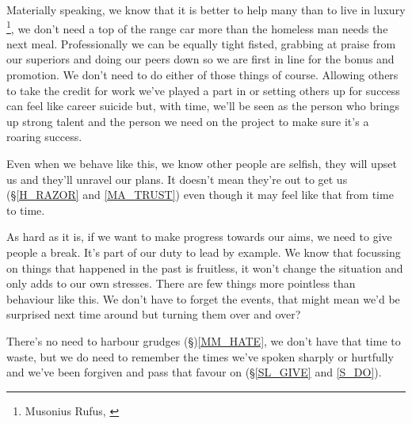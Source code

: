 \cleardoublepage
\begin{multicols}{2}

Materially speaking, we know that it is better to help many than to live in luxury \footnote{Musonius Rufus, \cite{RLS}}, we don't need a top of the range car more than the homeless man needs the next meal. Professionally we can be equally tight fisted, grabbing at praise from our superiors and doing our peers down so we are first in line for the bonus and promotion. We don't need to do either of those things of course. Allowing others to take the credit for work we've played a part in or setting others up for success can feel like career suicide but, with time, we'll be seen as the person who brings up strong talent and the person we need on the project to make sure it's a roaring success.

Even when we behave like this, we know other people are selfish, they will upset us and they'll unravel our plans. It doesn't mean they're out to get us (\S \ref{H_RAZOR} and \ref{MA_TRUST}) even though it may feel like that from time to time.

As hard as it is, if we want to make progress towards our aims, we need to give people a break. It's part of our duty to lead by example. We know that focussing on things that happened in the past is fruitless, it won't change the situation and only adds to our own stresses. There are few things more pointless than behaviour like this. We don't have to forget the events, that might mean we'd be surprised next time around but turning them over and over?

There's no need to harbour grudges (\S)\ref{MM_HATE}, we don't have that time to waste, but we do need to remember the times we've spoken sharply or hurtfully and we've been forgiven and pass that favour on (\S \ref{SL_GIVE} and \ref{S_DO}). 

\end{multicols}
\clearpage

